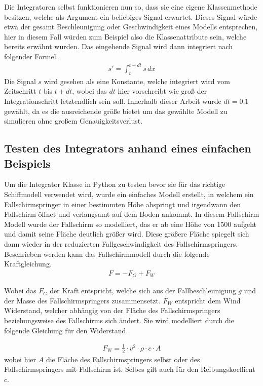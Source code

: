 \documentclass[]{iat}
\begin{document}
Die Integratoren selbst funktionieren nun so, dass sie eine eigene Klassenmethode besitzen, welche als Argument ein beliebiges Signal erwartet. Dieses Signal würde etwa der gesamt Beschleunigung oder Geschwindigkeit eines Modells entsprechen, hier in diesem Fall würden zum Beispiel also die Klassenattribute sein, welche bereits erwähnt wurden. Das eingehende Signal wird dann integriert nach folgender Formel.
\begin{align*}
    s' = \int_{t}^{t+dt} s \, dx
\end{align*}
Die Signal $s$ wird gesehen als eine Konstante, welche integriert wird vom Zeitschritt $t$ bis $t + dt$, wobei das $dt$ hier vorschreibt wie groß der Integrationschritt letztendlich sein soll. Innerhalb dieser Arbeit wurde $dt = 0.1$ gewählt, da es die ausreichende größe bietet um das gewählte Modell zu simulieren ohne großem Genauigkeitsverlust.
\newpage
\subsection{Testen des Integrators anhand eines einfachen Beispiels}
Um die Integrator Klasse in Python zu testen bevor sie für das richtige Schiffmodell verwendet wird, wurde ein einfaches Modell erstellt, in welchem ein Fallschirmspringer in einer bestimmten Höhe abspringt und irgendwann den Fallschirm öffnet und verlangsamt auf dem Boden ankommt. In diesem Fallschirm Modell wurde der Fallschirm so modelliert, das er ab eine Höhe von 1500 aufgeht und damit seine Fläche deutlich größer wird. Diese größere Fläche spiegelt sich dann wieder in der reduzierten Fallgeschwindigkeit des Fallschirmspringers. Beschrieben werden kann das Fallschirmmodell durch die folgende Kraftgleichung.
\begin{align*}
    F = -F_G + F_W
\end{align*}

Wobei das $F_G$ der Kraft entspricht, welche sich aus der Fallbeschleunigung $g$ und der Masse des Fallschirmspringers zusammensetzt. $F_W$ entspricht dem Wind Widerstand, welcher abhängig von der Fläche des Fallschirmspringers beziehungsweise des Fallschirms sich ändert. Sie wird modelliert durch die folgende Gleichung für den Widerstand.

\begin{align*}
    F_W = \frac{1}{2} \cdot v^2 \cdot \rho \cdot c \cdot A
\end{align*}
wobei hier $A$ die Fläche des Fallschirmspringers selbst oder des Fallschirmspringers mit Fallschirm ist. Selbes gilt auch für den Reibungskoeffient $c$.
\end{document}
